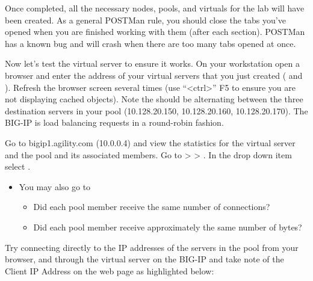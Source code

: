 \documentclass[letterpaper,10pt,english]{sphinxmanual}
\begin{document}

Once completed, all the necessary nodes, pools, and virtuals for the lab
will have been created. As a general POSTMan rule, you should close the
tabs you’ve opened when you are finished working with them (after each
section). POSTMan has a known bug and will crash when there are too many
tabs opened at once.

Now let’s test the virtual server to ensure it works. On your
workstation open a browser and enter the address of your virtual servers
that you just created (
and ). Refresh the
browser screen several times (use “\textless{}ctrl\textgreater{}” F5 to ensure you are not
displaying cached objects). Note the  should be
alternating between the three destination servers in your pool
(10.128.20.150, 10.128.20.160, 10.128.20.170). The BIG-IP is load
balancing requests in a round-robin fashion.

Go to bigip1.agility.com (10.0.0.4) and view the statistics for the
 virtual server and the  pool
and its associated members. Go to  \textgreater{}  \textgreater{} . In the  drop
down item select .

\begin{itemize}
\item {} 
You may also go to 
\begin{itemize}
\item {} 
Did each pool member receive the same number of connections?

\item {} 
Did each pool member receive approximately the same number of
bytes?

\end{itemize}

\end{itemize}

Try connecting directly to the IP addresses of the servers in the pool
from your browser, and through the virtual server on the BIG-IP and take
note of the Client IP Address on the web page as highlighted below:
\end{document}
